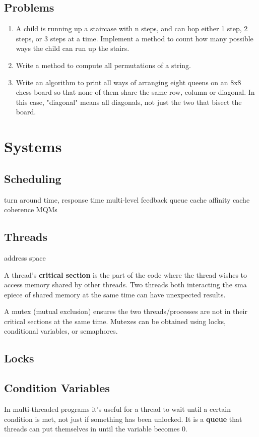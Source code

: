 \documentclass{article}
\begin{document}
	\subsection{Problems}
		\begin{enumerate}
			\item A child is running up a staircase with n steps, and can hop either 1 step, 2 steps, or 3 steps at a time. Implement a method to count how many possible ways the child can run up the stairs.
			\item Write a method to compute all permutations of a string.
			\item Write an algorithm to print all ways of arranging eight queens on an 8x8 chess board so that none of them share the same row, column or diagonal. In this case, "diagonal" means all diagonals, not just the two that bisect the board.
		\end{enumerate}


\clearpage
\section{Systems}
	\subsection{Scheduling}

		turn around time,
		response time
		multi-level feedback queue
		cache affinity
		cache coherence
		MQMs


	\subsection{Threads}

	address space


	A thread's {\bf critical section} is the part of the code where the thread wishes to access memory shared by other threads. Two threads both interacting the sma epiece of shared memory at the same time can have unexpected results.

	A mutex (mutual exclusion) ensures the two threads/processes are not in their critical sections at the same time. Mutexes can be obtained using locks, conditional variables, or semaphores.


	\subsection{Locks}


	\subsection{Condition Variables}
	In multi-threaded programs it's useful for a thread to wait until a certain condition is met, not just if something has been unlocked. It is a {\bf queue} that threads can put themselves in until the variable becomes 0.
\end{document}
